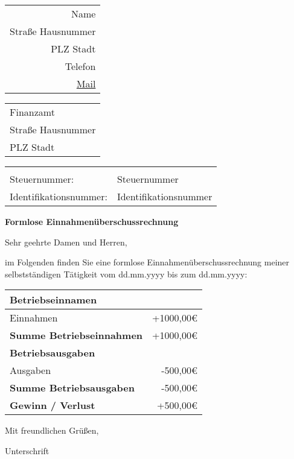 \documentclass[fontsize=11pt,parskip=half]{scrartcl}
\newcommand*{\MyCompanyName}{Name\xspace}
\newcommand*{\MyCompanyStreet}{Straße Hausnummer\xspace}
\newcommand*{\MyCompanyCity}{PLZ Stadt\xspace}
\newcommand*{\MyCompanyTaxNumber}{Steuernummer\xspace}
\newcommand*{\MyCompanyUstIdNumber}{Identifikationsnummer\xspace}
\newcommand*{\MyMobilePhone}{Telefon\xspace}
\newcommand*{\MyEmail}{Mail}
\newcommand*{\TheirCompanyName}{Finanzamt\xspace}
\newcommand*{\TheirCompanyStreet}{Straße Hausnummer\xspace}
\newcommand*{\TheirCompanyCity}{PLZ Stadt\xspace}
\newcommand*{\VSpace}{1.25em}
\newcommand*{\Vspace}{0.5em}
\begin{document}
\DateFormat
\sffamily

\begin{minipage}[t]{\textwidth}
	\raggedleft
  \begin{tabular}{@{}r@{}}
    \MyCompanyName\\
    \MyCompanyStreet\\
    \MyCompanyCity\\
    \MyMobilePhone\\
    \href{mailto:\MyEmail}{\MyEmail}\\
  \end{tabular}
\end{minipage}

\vspace{\VSpace}

\begin{minipage}[t]{.5\textwidth}
	\vspace{0pt}
  \begin{tabular}{@{}l@{}}
    \TheirCompanyName\\
    \TheirCompanyStreet\\
    \TheirCompanyCity\\
  \end{tabular}
\end{minipage}
\begin{minipage}[t]{0.5\textwidth}
  \vspace{0pt}
  \raggedleft
  \begin{tabular}{@{}ll}
    &\\
    Steuernummer:   & \MyCompanyTaxNumber\\
    Identifikationsnummer:  & \MyCompanyUstIdNumber\\
  \end{tabular}
\end{minipage}

\vspace{\VSpace}

\textbf{Formlose Einnahmenüberschussrechnung}

\vspace{\VSpace}

Sehr geehrte Damen und Herren,

im Folgenden finden Sie eine formlose Einnahmenüberschussrechnung meiner selbstständigen Tätigkeit vom dd.mm.yyyy bis zum dd.mm.yyyy:

\def\arraystretch{1.5}
\begin{tabularx}{\textwidth}{@{}L{0.8}R{0.2}}
  \textbf{Betriebseinnamen} &\\
  \hline
  Einnahmen & +1000,00\euro{}\\
  \hline
  \textbf{Summe Betriebseinnahmen} & +1000,00\euro{}\\
  \hline\hline
  \textbf{Betriebsausgaben} &\\
  \hline
  Ausgaben & -500,00\euro{}\\
  \hline
  \textbf{Summe Betriebsausgaben} & -500,00\euro{}\\
  \hline\hline
  \textbf{Gewinn / Verlust} & +500,00\euro{}\\
\end{tabularx}

\vspace{\Vspace}

Mit freundlichen Grüßen,
\vspace{\VSpace}

Unterschrift
\end{document}
